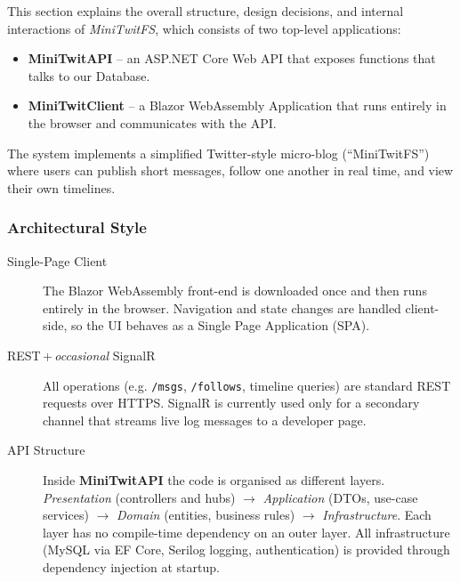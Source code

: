 \label{sec:design-architecture}

This section explains the overall structure, design decisions, and internal interactions of \emph{MiniTwitFS}, which consists of two top-level applications:

\begin{itemize}
  \item \textbf{MiniTwitAPI} – an ASP.NET Core Web API that exposes functions that talks to our Database.
  \item \textbf{MiniTwitClient} – a Blazor WebAssembly Application that runs entirely in the browser and communicates with the API.
\end{itemize}
The system implements a simplified Twitter-style micro-blog (“MiniTwitFS”)
where users can publish short messages, follow one another in
real time, and view their own timelines.

\subsubsection{Architectural Style}

\begin{description}
  \item[Single-Page Client]  
        The Blazor WebAssembly front-end is downloaded once and
        then runs entirely in the browser. Navigation and state changes are
        handled client-side, so the UI behaves as a Single Page Application (SPA).

  \item[REST\,+\,\textit{occasional} SignalR]  
        All operations (e.g. \verb|/msgs|, \verb|/follows|, timeline
        queries) are standard REST requests over HTTPS. SignalR is currently used only for a secondary channel that streams live log messages to a developer page.

  \item[API Structure]  
        Inside \textbf{MiniTwitAPI} the code is organised as different layers.
        \emph{Presentation} (controllers and hubs)  
        $\rightarrow$ \emph{Application} (DTOs, use-case services)  
        $\rightarrow$ \emph{Domain} (entities, business rules)  
        $\rightarrow$ \emph{Infrastructure}.  
        Each layer has no compile-time dependency on an outer layer. All infrastructure (MySQL via EF Core, Serilog logging, authentication) is provided through dependency injection at startup.
\end{description}

